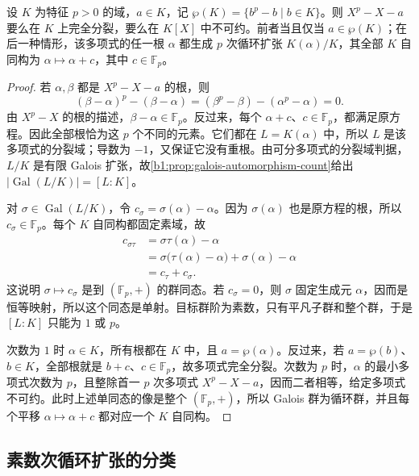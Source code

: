 \begin{proposition}\label{b1:prop:artin-schreier-polynomial}
	设 \(K\) 为特征 \(p>0\) 的域，\(a\in K\)，记 \(\wp(K)=\{b^p-b\mid b\in K\}\)。则 \(X^p-X-a\) 要么在 \(K\) 上完全分裂，要么在 \(K[X]\) 中不可约。前者当且仅当 \(a\in\wp(K)\)；在后一种情形，该多项式的任一根 \(\alpha\) 都生成 \(p\) 次循环扩张 \(K(\alpha)/K\)，其全部 \(K\) 自同构为 \(\alpha\mapsto\alpha+c\)，其中 \(c\in\mathbb F_p\)。
\end{proposition}
\begin{proof}
	若 \(\alpha,\beta\) 都是 \(X^p-X-a\) 的根，则
	\[
		(\beta-\alpha)^p-(\beta-\alpha) =(\beta^p-\beta)-(\alpha^p-\alpha)=0.
	\]
	由 \(X^p-X\) 的根的描述，\(\beta-\alpha\in\mathbb F_p\)。反过来，每个 \(\alpha+c\)、\(c\in\mathbb F_p\)，都满足原方程。因此全部根恰为这 \(p\) 个不同的元素。它们都在 \(L=K(\alpha)\) 中，所以 \(L\) 是该多项式的分裂域；导数为 \(-1\)，又保证它没有重根。由可分多项式的分裂域判据，\(L/K\) 是有限 Galois 扩张，故\cref{b1:prop:galois-automorphism-count}给出 \(|\operatorname{Gal}(L/K)|=[L:K]\)。

	对 \(\sigma\in\operatorname{Gal}(L/K)\)，令 \(c_\sigma=\sigma(\alpha)-\alpha\)。因为 \(\sigma(\alpha)\) 也是原方程的根，所以 \(c_\sigma\in\mathbb F_p\)。每个 \(K\) 自同构都固定素域，故
	\[
		\begin{aligned}
			c_{\sigma\tau} &=\sigma\tau(\alpha)-\alpha\\
			&=\sigma\bigl(\tau(\alpha)-\alpha\bigr)+\sigma(\alpha)-\alpha\\
			&=c_\tau+c_\sigma.
		\end{aligned}
	\]
	这说明 \(\sigma\mapsto c_\sigma\) 是到 \((\mathbb F_p,+)\) 的群同态。若 \(c_\sigma=0\)，则 \(\sigma\) 固定生成元 \(\alpha\)，因而是恒等映射，所以这个同态是单射。目标群阶为素数，只有平凡子群和整个群，于是 \([L:K]\) 只能为 \(1\) 或 \(p\)。

	次数为 \(1\) 时 \(\alpha\in K\)，所有根都在 \(K\) 中，且 \(a=\wp(\alpha)\)。反过来，若 \(a=\wp(b)\)、\(b\in K\)，全部根就是 \(b+c\)、\(c\in\mathbb F_p\)，故多项式完全分裂。次数为 \(p\) 时，\(\alpha\) 的最小多项式次数为 \(p\)，且整除首一 \(p\) 次多项式 \(X^p-X-a\)，因而二者相等，给定多项式不可约。此时上述单同态的像是整个 \((\mathbb F_p,+)\)，所以 Galois 群为循环群，并且每个平移 \(\alpha\mapsto\alpha+c\) 都对应一个 \(K\) 自同构。
\end{proof}

\subsection{素数次循环扩张的分类}
\label{b1:subsec:2004:02}

